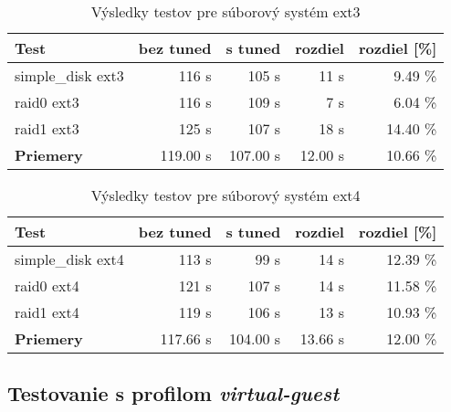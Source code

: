 \begin{table}[H]
\begin{center}
\begin{tabular}{|l|r|r|r|r|}
    \hline
    \textbf{Test} & \textbf{bez tuned} & \textbf{s tuned} & \textbf{rozdiel} & \textbf{rozdiel [\%]} \\ \hline
    simple\_disk ext3 & 116 s & 105 s & 11 s & 9.49 \% \\
    \hline
    raid0 ext3 & 116 s & 109 s & 7 s & 6.04 \% \\
    \hline
    raid1 ext3 & 125 s & 107 s & 18 s & 14.40 \% \\
    \hline
    \textbf{Priemery} & 119.00 s & 107.00 s & 12.00 s & 10.66 \% \\
    \hline
\end{tabular}
\caption{Výsledky testov pre súborový systém ext3}
\label{tab:results-ext3}
\end{center}
\end{table}

\begin{table}[H]
\begin{center}
\begin{tabular}{|l|r|r|r|r|}
    \hline
    \textbf{Test} & \textbf{bez tuned} & \textbf{s tuned} & \textbf{rozdiel} & \textbf{rozdiel [\%]} \\ \hline
    simple\_disk ext4 & 113 s & 99 s & 14 s & 12.39 \% \\
    \hline
    raid0 ext4 & 121 s & 107 s & 14 s & 11.58 \% \\
    \hline
    raid1 ext4 & 119 s & 106 s & 13 s & 10.93 \% \\
    \hline
    \textbf{Priemery} & 117.66 s & 104.00 s & 13.66 s & 12.00 \% \\
    \hline
\end{tabular}
\caption{Výsledky testov pre súborový systém ext4}
\label{tab:results-ext4}
\end{center}
\end{table}

\subsection{Testovanie s profilom \emph{virtual-guest}}

